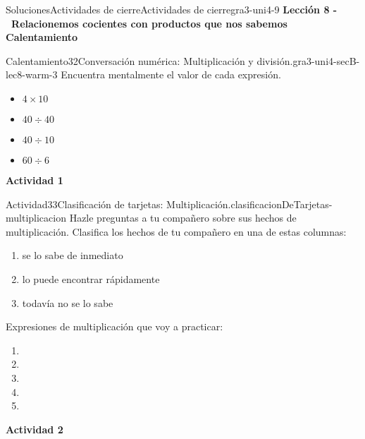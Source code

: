 \documentclass[twoside,10pt,]{article}
\newlength{\fillinmaxwidth}
\newlength{\fillincontract}
\newlength{\fillinheight}
\newcommand{\fillintext}[1]{%
\setlength{\fillinmaxwidth}{#1em*\real{0.5}}%
\setlength{\fillincontract}{#1em*\real{0.5}*\real{0.2}}%
\setlength{\fillinheight}{\heightof{\strut}+1.2pt}%
\strut\nobreak\leaders\vbox{\hrule width 0.3pt height 0.3pt \vskip -1.2pt}\hskip 1\fillinmaxwidth minus \fillincontract\nobreak\strut%
}
\begin{document}
\begin{solutions-section}{Soluciones}{Actividades de cierre}{}{Actividades de cierre}{}{}{gra3-uni4-9}
\noindent\textbf{\large{}\space\textperiodcentered\space{}Lección 8 -~Relacionemos cocientes con productos que nos sabemos\\
\space\textperiodcentered\space{}Calentamiento}
\begin{explorationsolution}{Calentamiento}{32}{Conversación numérica: Multiplicación y división.}{gra3-uni4-secB-lec8-warm-3}%
Encuentra mentalmente el valor de cada expresión.%
%
\begin{itemize}[label=\textbullet]
\item{}\(\displaystyle 4\times 10\)%
\item{}\(\displaystyle 40\div 40\)%
\item{}\(\displaystyle 40\div 10\)%
\item{}\(\displaystyle 60\div 6\)%
\end{itemize}
\end{explorationsolution}%
\par\medskip
\noindent\textbf{\large{}\space\textperiodcentered\space{}Actividad 1}
\begin{activitysolution}{Actividad}{33}{Clasificación de tarjetas: Multiplicación.}{clasificacionDeTarjetas-multiplicacion}%
Hazle preguntas a tu compañero sobre sus hechos de multiplicación. Clasifica los hechos de tu compañero en una de estas columnas:%
%
\begin{enumerate}
\item{}se lo sabe de inmediato%
\item{}lo puede encontrar rápidamente%
\item{}todavía no se lo sabe%
\end{enumerate}
Expresiones de multiplicación que voy a practicar:%
%
\begin{enumerate}
\item{}%
\item{}%
\item{}%
\item{}%
\item{}%
\end{enumerate}
\end{activitysolution}%
\par\medskip
\noindent\textbf{\large{}\space\textperiodcentered\space{}Actividad 2}
\end{solutions-section}
\end{document}
